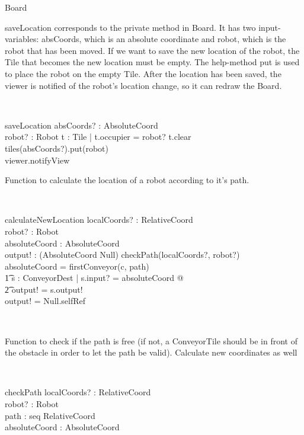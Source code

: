 \begin{class}{Board}
\begin{classcom}
saveLocation corresponds to the private method in Board. It has two input-variables: absCoords, which is an absolute coordinate and robot, which is the robot that has been moved.  If we want to save the new location of the robot, the Tile that becomes the new location must be empty. The help-method put is used to place the robot on the empty Tile. After the location has been saved, the viewer is notified of the robot's location change, so it can redraw the Board.
\end{classcom} \\
\begin{schema}{saveLocation}
absCoords? : AbsoluteCoord \\
robot? : Robot
\where
\exists t : Tile | t.occupier = robot? \wedge t.clear\\
tiles(absCoords?).put(robot) \\
viewer.notifyView
\end{schema}
\znewpage
\begin{classcom}
Function to calculate the location of a robot according to it's path.
\end{classcom}\\
\begin{schema}{calculateNewLocation}
localCoords? : RelativeCoord \\
robot? : Robot \\
absoluteCoord : AbsoluteCoord \\
output! : (AbsoluteCoord \union Null)
\where
\IF checkPath(localCoords?, robot?) \\
\THEN absoluteCoord = firstConveyor(c, path) \\ \t1
\exists s : ConveyorDest | s.input? = absoluteCoord @ \\ \t2
output! = s.output! \\
\ELSE output! = Null.selfRef
\end{schema} \\
\begin{classcom}
Function to check if the path is free (if not, a ConveyorTile should be in front of the obstacle in order to let the path be valid). Calculate new coordinates as well
\end{classcom} \\
\begin{schema}{checkPath}
localCoords? : RelativeCoord \\
robot? : Robot \\
path : seq RelativeCoord \\
absoluteCoord : AbsoluteCoord \\

\end{schema}
\end{class}
